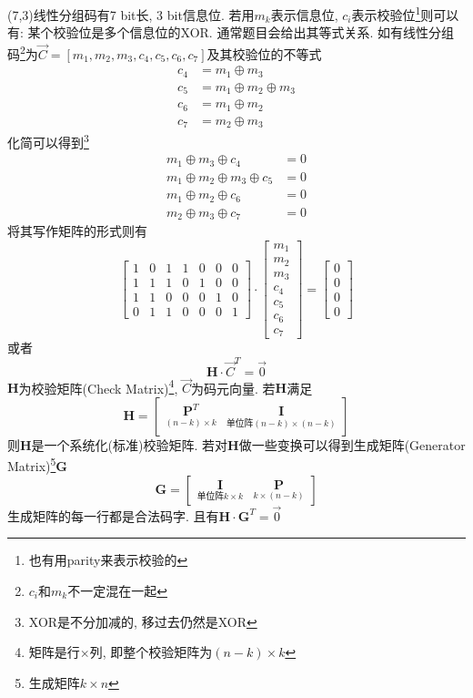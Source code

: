 \documentclass[a4paper]{report}
\begin{document}
(7,3)线性分组码有7 bit长, 3 bit信息位. 若用$m_k$表示信息位, $c_i$表示校验位\footnote{也有用parity来表示校验的}则可以有: 某个校验位是多个信息位的XOR. 
通常题目会给出其等式关系. 如有线性分组码\footnote{$c_i$和$m_k$不一定混在一起}为$\vec{C}=[m_1,m_2,m_3,c_4,c_5,c_6,c_7]$及其校验位的不等式
\begin{align*}
  c_4&=m_1\oplus m_3
  \\c_5&=m_1\oplus m_2 \oplus m_3
  \\c_6&=m_1\oplus m_2
  \\c_7&=m_2\oplus m_3
\end{align*}
化简可以得到\footnote{XOR是不分加减的, 移过去仍然是XOR}
\begin{align*}
  m_1\oplus m_3\oplus c_4&=0
  \\m_1\oplus m_2 \oplus m_3\oplus c_5&=0
  \\m_1\oplus m_2\oplus c_6&=0
  \\m_2\oplus m_3\oplus c_7&=0
\end{align*}
将其写作矩阵的形式则有
\[
  \begin{bmatrix}
    1&0&1&1&0&0&0\\
    1&1&1&0&1&0&0\\
    1&1&0&0&0&1&0\\
    0&1&1&0&0&0&1
  \end{bmatrix}
  \cdot
  \begin{bmatrix}
    m_1\\m_2\\m_3\\c_4\\c_5\\c_6\\c_7
  \end{bmatrix}
  =
  \begin{bmatrix}
    0\\0\\0\\0
  \end{bmatrix}
\]
或者
$$\textbf{H}\cdot \vec{C}^T=\vec{0}$$
$\textbf{H}$为校验矩阵(Check Matrix)\footnote{矩阵是行$\times$列, 即整个校验矩阵为$(n-k)\times k$}, $\vec{C}$为码元向量. 若$\textbf{H}$满足
$$\textbf{H}=\begin{bmatrix}
  \underset{(n-k)\times k}{\textbf{P}^T}&\underset{\text{单位阵}(n-k)\times (n-k)}{\textbf{I}}
\end{bmatrix}$$
则$\textbf{H}$是一个系统化(标准)校验矩阵. 
若对$\textbf{H}$做一些变换可以得到生成矩阵(Generator Matrix)\footnote{生成矩阵$k\times n$}$\textbf{G}$
$$\textbf{G}=\begin{bmatrix}
  \underset{\text{单位阵}k\times k}{\textbf{I}}&\underset{k\times (n-k)}{\textbf{P}}
\end{bmatrix}$$
生成矩阵的每一行都是合法码字. 且有$\textbf{H}\cdot\textbf{G}^T=\vec{0}$
\end{document}
